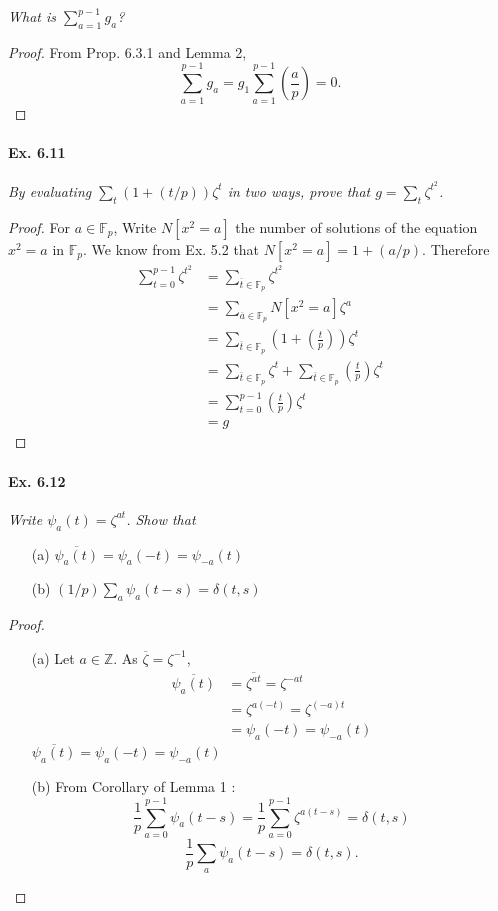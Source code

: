 \documentclass[11pt,a4paper]{article}
\newcommand{\Z}{\mathbb{Z}}
\newcommand{\F}{\mathbb{F}}
\newcommand{\legendre}[2]{\genfrac{(}{)}{}{}{#1}{#2}}
\begin{document}
{\it  What is $\sum_{a=1}^{p-1} g_a$?
}

\begin{proof}
From Prop. 6.3.1 and Lemma 2,
$$\sum_{a=1}^{p-1} g_a = g_1 \sum_{a=1}^{p-1} \legendre{a}{p} = 0.$$
\end{proof}

\paragraph{Ex. 6.11}

{\it By evaluating $\sum_t (1+(t/p)) \zeta^t$ in two ways, prove that $g = \sum_t \zeta^{t^2}$.
}

\begin{proof}
For $ a \in \F_p$, Write $N[x^2 = a]$ the number of solutions of the equation $x^2 = a$ in $\F_p$.
We know from Ex. 5.2 that $N[x^2 = a] = 1 + (a/p)$. Therefore
\begin{align*}
\sum_{t=0}^{p-1} \zeta^{t^2} &= \sum_{\overline{t} \in \F_p} \zeta^{t^2} \\
 & = \sum_{\overline{a} \in \F_p} N[x^2 = a] \zeta^a\\
&=\sum_{\overline{t} \in \F_p} \left(1 + \legendre{t}{p} \right) \zeta^t\\
&=\sum_{\overline{t} \in \F_p} \zeta ^t + \sum_{\overline{t} \in \F_p}  \legendre{t}{p} \zeta^t\\
 &=\sum_{t = 0} ^{p-1}  \legendre{t}{p} \zeta^t\\
 &= g
\end{align*}
\end{proof}

\paragraph{Ex. 6.12}

{\it Write $\psi_a(t) = \zeta^{at}$. Show that
\begin{enumerate}
\item[(a)] $\overline{\psi_a(t)} = \psi_a(-t) = \psi_{-a}(t)$
\item[(b)] $(1/p)\sum_a \psi_a(t-s) = \delta(t, s)$
\end{enumerate}
}

\begin{proof}
\begin{enumerate}
\item[(a)]  Let $a\in \Z$. As $\overline{\zeta} = \zeta^{-1}$, 
\begin{align*}
\overline{\psi_a(t)} &=\overline{\zeta^{at}}= \zeta^{-at}\\
& = \zeta^{a(-t)} = \zeta^{(-a)t}\\
& = \psi_a(-t) = \psi_{-a}(t)
\end{align*}
$\overline{\psi_a(t)} = \psi_a(-t) = \psi_{-a}(t)$
\item[(b)] 
From Corollary of Lemma 1 :
$$\frac{1}{p} \sum_{a=0}^{p-1} \psi_a(t-s) = \frac{1}{p} \sum_{a=0}^{p-1} \zeta^{a(t-s)} = \delta(t,s)$$
$$\frac{1}{p}\sum_a \psi_a(t-s) = \delta(t, s).$$
\end{enumerate}
\end{proof}
\end{document}
